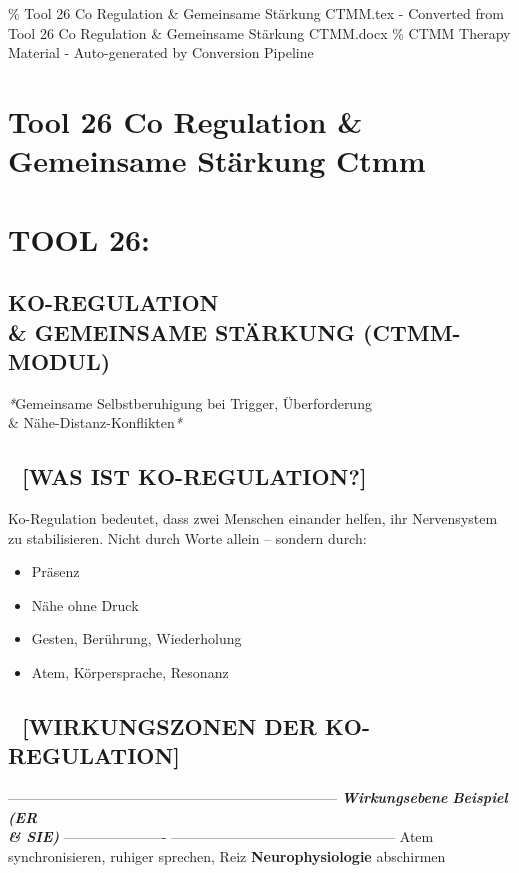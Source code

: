 \% Tool 26 Co Regulation \& Gemeinsame Stärkung CTMM.tex - Converted from Tool 26 Co Regulation \& Gemeinsame Stärkung CTMM.docx
\% CTMM Therapy Material - Auto-generated by Conversion Pipeline

\section{Tool 26 Co Regulation \& Gemeinsame Stärkung Ctmm}
\label{sec:tool-26-co-regulation-gemeinsame-st-rkung-ctmm}

\section{\textcolor{ctmmPurple}{\faBrain} \textbf{TOOL 26:}}
\subsection{\textbf{KO-REGULATION \\& GEMEINSAME STÄRKUNG (\textcolor{ctmmBlue}{CTMM}-MODUL)}}

\textcolor{ctmmBlue}{\faPuzzlePiece} \textit{*}Gemeinsame Selbstberuhigung bei \textcolor{ctmmRed}{Trigger}, Überforderung \\&
Nähe-Distanz-Konflikten\textit{*}

\subsection{🤝 \textbf{[WAS IST KO-REGULATION?]}}

Ko-Regulation bedeutet, dass zwei Menschen einander helfen, ihr
Nervensystem zu stabilisieren. Nicht durch Worte allein -- sondern
durch:

\begin{itemize}
\item   Präsenz
\item   Nähe ohne Druck
\item   Gesten, Berührung, Wiederholung
\item   Atem, Körpersprache, Resonanz
\end{itemize}

\subsection{💞 \textbf{[WIRKUNGSZONEN DER KO-REGULATION]}}

-----------------------------------------------------------------------
\textbf{\textit{Wirkungsebene}}    \textbf{\textit{Beispiel (ER \\& SIE)}}
---------------------- ------------------------------------------------
\textcolor{ctmmPurple}{\faBrain}                     Atem synchronisieren, ruhiger sprechen, Reiz
\textbf{Neurophysiologie}   abschirmen

